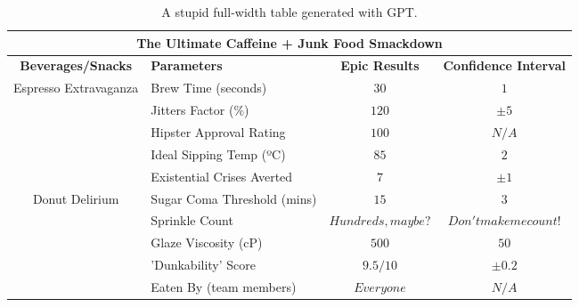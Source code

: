 
\begin{table*}[h!]
    \centering
    \begin{tabular}{|c|l|c|c|}
        \hline
        \multicolumn{4}{|c|}{\textbf{The Ultimate Caffeine + Junk Food Smackdown}}                                     \\
        \hline
        \textbf{Beverages/Snacks} & \textbf{Parameters}         & \textbf{Epic Results} & \textbf{Confidence Interval} \\
        \hline
        \multirow{5}{*}{Espresso Extravaganza}
                                  & Brew Time (seconds)         & \(30\)                & \(1\)                        \\
                                  & Jitters Factor (\%)         & \(120\)               & \(±5\)                       \\
                                  & Hipster Approval Rating     & \(100\)               & \(N/A\)                      \\
                                  & Ideal Sipping Temp (ºC)     & \(85\)                & \(2\)                        \\
                                  & Existential Crises Averted  & \(7\)                 & \(±1\)                       \\
        \hline
        \multirow{5}{*}{Donut Delirium}
                                  & Sugar Coma Threshold (mins) & \(15\)                & \(3\)                        \\
                                  & Sprinkle Count              & \(Hundreds, maybe?\)  & \(Don't make me count!\)     \\
                                  & Glaze Viscosity (cP)        & \(500\)               & \(50\)                       \\
                                  & 'Dunkability' Score         & \(9.5/10\)            & \(±0.2\)                     \\
                                  & Eaten By (team members)     & \(Everyone\)          & \(N/A\)                      \\
        \hline
    \end{tabular}
    \caption{A stupid full-width table generated with GPT.}
\end{table*}